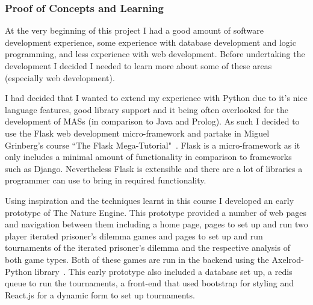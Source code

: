 \documentclass[]{final_report}
\begin{document}
\subsubsection{Proof of Concepts and Learning}
At the very beginning of this project I had a good amount of software development experience, some experience with database development and logic programming, and less experience with web development. Before undertaking the development I decided I needed to learn more about some of these areas (especially web development).\par 
I had decided that I wanted to extend my experience with Python due to it's nice language features, good library support and it being often overlooked for the development of MASs (in comparison to Java and Prolog). As such I decided to use the Flask web development micro-framework and partake in Miguel Grinberg's course ``The Flask Mega-Tutorial"~\cite{flask_tut}. Flask is a micro-framework as it only includes a minimal amount of functionality in comparison to frameworks such as Django. Nevertheless Flask is extensible and there are a lot of libraries a programmer can use to bring in required functionality.\par 
Using inspiration and the techniques learnt in this course I developed an early prototype of The Nature Engine. This prototype provided a number of web pages and navigation between them including a home page, pages to set up and run two player iterated prisoner's dilemma games and pages to set up and run tournaments of the iterated prisoner's dilemma and the respective analysis of both game types. Both of these games are run in the backend using the Axelrod-Python library~\cite{axelrodproject}. This early prototype also included a database set up, a redis queue to run the tournaments, a front-end that used bootstrap for styling and React.js for a dynamic form to set up tournaments.\par
\end{document}

